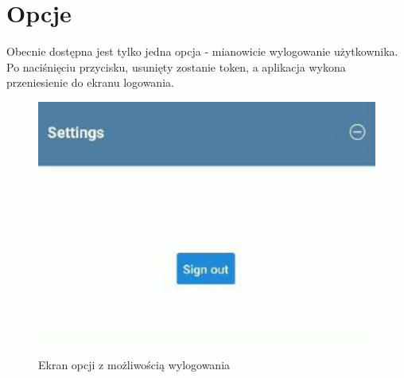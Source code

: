 \section{Opcje}
Obecnie dostępna jest tylko jedna opcja - mianowicie wylogowanie użytkownika. Po naciśnięciu przycisku, usunięty zostanie token, a aplikacja wykona przeniesienie do ekranu logowania.
\begin{figure}[H]
	\centering
	\includegraphics{options.pdf}
	\caption{Ekran opcji z możliwością wylogowania}
\end{figure}

